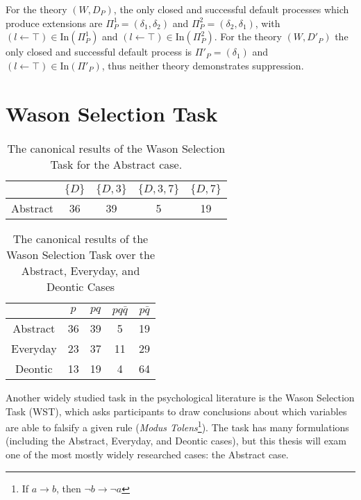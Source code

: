 For the theory $(W,D_P)$, the only closed and successful default processes which produce extensions are $\Pi_P^1=(\delta_1,\delta_2)$ and $\Pi^2_P=(\delta_2,\delta_1)$, with $(l\leftarrow \top)\in \text{In}(\Pi^1_P)$ and $(l\leftarrow \top)\in \text{In}(\Pi^2_P)$. For the theory $(W,D'_P)$ the only closed and successful default process is $\Pi'_P=(\delta_1)$ and $(l\leftarrow \top)\in \text{In}(\Pi'_P)$, thus neither theory demonstrates suppression.

\section{Wason Selection Task}\label{ssec:wst}
\begin{table}
\begin{center}


\begin{tabular}{ c c c c c}
  & \textbf{$\{D\}$} & \textbf{$\{D,3\}$} & \textbf{$\{D,3,7\}$} & \textbf{$\{D,7\}$}\\ 
  \hline
 Abstract & 36 & 39 & 5 & 19\\  
\end{tabular}
\caption{The canonical results of the Wason Selection Task for the Abstract case.}
\label{tbl:can}
\end{center}
\end{table}

\begin{table}
\begin{center}
\begin{tabular}{ c c c c c}
  & \textbf{$p$} & \textbf{$pq$} & \textbf{$pq\bar{q}$} & \textbf{$p\bar{q}$}\\ 
  \hline
 Abstract & 36 & 39 & 5 & 19\\  
 Everyday & 23 & 37 & 11 & 29\\  
 Deontic & 13 & 19 & 4 & 64
\end{tabular}
\caption{The canonical results of the Wason Selection Task over the Abstract, Everyday, and Deontic Cases}
\label{tbl:can_full}
\end{center}
\end{table}

Another widely studied task in the psychological literature is the Wason Selection Task (WST), which asks participants to draw conclusions about which variables are able to falsify a given rule (\textit{Modus Tolens}\footnote{If $a\rightarrow b$, then $\lnot b \rightarrow \lnot a$}). The task has many formulations (including the Abstract, Everyday, and Deontic cases), but this thesis will exam one of the most mostly widely researched cases: the Abstract case. 

